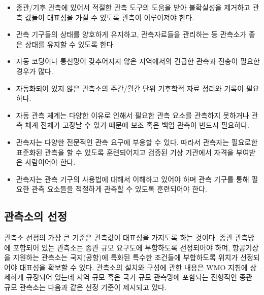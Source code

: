\begin{itemize}
	\item 종관/기후 관측에 있어서 적절한 관측 도구의 도움을 받아 불확실성을 제거하고 관측 값들이 대표성을 가질 수 있도록 관측이 이루어져야 한다.
	\item 관측 기구들의 상태를 양호하게 유지하고, 관측자료들을 관리하는 등 관측소가 좋은 상태를 유지할 수 있도록 한다.
	\item 자동 코딩이나 통신망이 갖추어지지 않은 지역에서의 긴급한 관측과 전송이 필요한 경우가 많다.
	\item 자동화되어 있지 않은 관측소의 주간/월간 단위 기후학적 자료 정리와 기록이 필요하다.
	\item 자동 관측 체계는 다양한 이유로 인해서 필요한 관측 요소를 관측하지 못하거나 관측 체계 전체가 고장날 수 있기 때문에 보조 혹은 백업 관측이 반드시 필요하다.
	\item 관측자는 다양한 전문적인 관측 요구에 부응할 수 있다. 따라서 관측자는 필요로한 표준화된 관측을 할 수 있도록 훈련되어지고 검증된 기상 기관에서 자격을 부여받은 사람이어야 한다. 
	\item 관측자는 관측 기구의 사용법에 대해서 이해하고 있어야 하며 관측 기구를 통해 필요한 관측 요소들을 적절하게 관측할 수 있도록 훈련되어야 한다.
\end{itemize}
	
\subsection{관측소의 선정}
관측소 선정의 가장 큰 기준은 관측값이 대표성을 가지도록 하는 것이다. 종관 관측망에 포함되어 있는 관측소는 종관 규모 요구도에 부합하도록 선정되어야 하며, 항공기상을 지원하는 관측소는 국지(공항)에 특화된 특수한 조건들에 부합하도록 위치가 선정되어야 대표성을 확보할 수 있다. 관측소의 설치와 구성에 관한 내용은 WMO 지침에 상세하게 규정되어 있는데
지역 규모 혹은 국가 규모 관측망에 포함되는 전형적인 종관 규모 관측소는 다음과 같은 선정 기준이 제시되고 있다.

